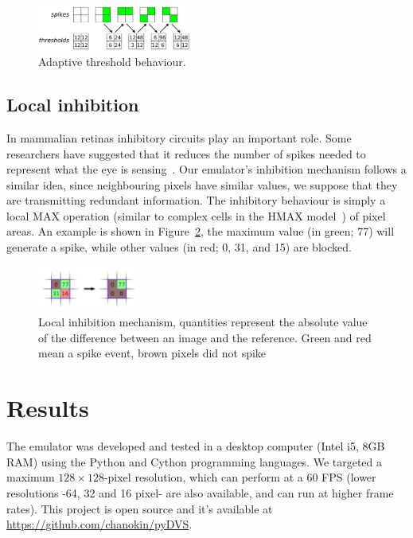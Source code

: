 \documentclass[conference]{IEEEtran}
\begin{document}
%
\begin{figure}[hbt]
  \centering
  \includegraphics[width=0.45\textwidth]{adaptive_thresh_boxes}
  \caption{Adaptive threshold behaviour.}
  \label{fig:adpt_thresh}
\end{figure}

\subsection{Local inhibition} 
In mammalian retinas inhibitory circuits play an important role. Some researchers have suggested that it reduces the number of spikes needed to represent what the eye is sensing~\cite{basab}. Our emulator's inhibition mechanism follows a similar idea, since neighbouring pixels have similar values, we suppose that they are transmitting redundant information. The inhibitory behaviour is simply a local MAX operation (similar to complex cells in the HMAX model~\cite{riesenhuber1999hierarchical}) of pixel areas. An example is shown in Figure~\ref{fig:local_inh}, the maximum value (in green; 77) will generate a spike, while other values (in red; 0, 31, and 15) are blocked.

\begin{figure}[htb]
\centering
    \includegraphics[width=0.3\textwidth]{inh_local_max_img}
    \caption{Local inhibition mechanism, quantities represent the absolute value of the difference between an image and the reference. Green and red mean a spike event, brown pixels did not spike}

  \label{fig:local_inh}
\end{figure}

\section{Results}
\label{sec:results}
The emulator was developed and tested in a desktop computer (Intel i5, 8GB RAM) using the Python and Cython programming languages. We targeted a maximum $128\times 128$-pixel resolution, which can perform at a 60 FPS (lower resolutions -64, 32 and 16 pixel- are also available, and can run at higher frame rates). This project is open source and it's available at \url{https://github.com/chanokin/pyDVS}.
\end{document}

